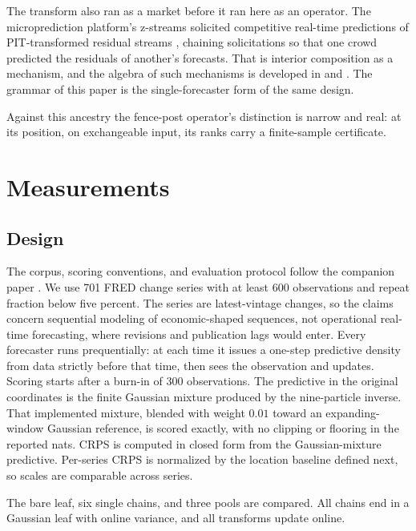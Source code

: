 \documentclass[11pt]{article}
\theoremstyle{remark}
\begin{document}
The transform also ran as a market before it ran here as an operator. The
microprediction platform's z-streams solicited competitive real-time predictions of
PIT-transformed residual streams \citep{cotton2022microprediction}, chaining
solicitations so that one crowd predicted the residuals of another's forecasts. That is
interior composition as a mechanism, and the algebra of such mechanisms is developed in
\citet{cotton2026algebra} and \citet{cotton2026multistage}. The grammar of this paper
is the single-forecaster form of the same design.

Against this ancestry the
fence-post operator's distinction is narrow and real: at its position, on exchangeable
input, its ranks carry a finite-sample certificate.

\section{Measurements}\label{sec:experiments}

\subsection{Design}\label{sec:design}

The corpus, scoring conventions, and evaluation protocol follow the companion paper
\citep{cotton2026gap}. We use 701 FRED change series with at least 600 observations and
repeat fraction below five percent. The series are latest-vintage changes, so the claims
concern sequential modeling of economic-shaped sequences, not operational real-time
forecasting, where revisions and publication lags would enter. Every forecaster runs prequentially: at each time it
issues a one-step predictive density from data strictly before that time, then sees the
observation and updates. Scoring starts after a burn-in of 300 observations. The predictive in the original coordinates is the finite Gaussian mixture produced by
the nine-particle inverse. That implemented mixture, blended with weight $0.01$ toward
an expanding-window Gaussian reference, is scored exactly, with no clipping or
flooring in the reported nats. CRPS is computed in closed
form from the Gaussian-mixture predictive. Per-series CRPS is normalized by the location
baseline defined next, so scales are comparable across series.

The bare leaf, six single chains, and three pools are compared. All chains end in a Gaussian leaf with
online variance, and all transforms update online.
\end{document}
